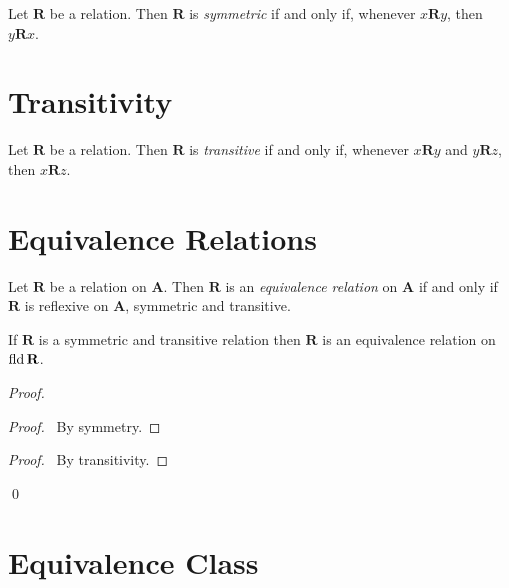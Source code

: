 \begin{definition}
    Let $\mathbf{R}$ be a relation. Then $\mathbf{R}$ is \emph{symmetric} if and only if,
    whenever $x\mathbf{R}y$, then $y\mathbf{R}x$.
\end{definition}

\section{Transitivity}

\begin{definition}
    Let $\mathbf{R}$ be a relation. Then $\mathbf{R}$ is \emph{transitive} if and only if,
    whenever $x\mathbf{R}y$ and $y\mathbf{R}z$, then $x\mathbf{R}z$.
\end{definition}

\section{Equivalence Relations}

\begin{definition}
    Let $\mathbf{R}$ be a relation on $\mathbf{A}$. Then $\mathbf{R}$ is an \emph{equivalence relation}
    on $\mathbf{A}$ if and only if $\mathbf{R}$ is reflexive on $\mathbf{A}$, symmetric and transitive.
\end{definition}

\begin{theorem}
    If $\mathbf{R}$ is a symmetric and transitive relation then $\mathbf{R}$ is an equivalence
    relation on $\operatorname{fld} \mathbf{R}$.
\end{theorem}

\begin{proof}
    \pf
    \begin{proof}
        \pf\ By symmetry.
    \end{proof}
    \begin{proof}
        \pf\ By transitivity.
    \end{proof}
    \qed
\end{proof}

\section{Equivalence Class}

